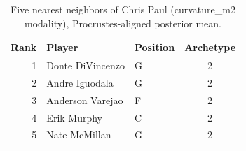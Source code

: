 \begin{table}[htbp]
  \centering\small
  \begin{tabular}{rllc}
    \toprule
    Rank & Player & Position & Archetype \\
    \midrule
    1 & Donte DiVincenzo & G & 2 \\
    2 & Andre Iguodala & G & 2 \\
    3 & Anderson Varejao & F & 2 \\
    4 & Erik Murphy & C & 2 \\
    5 & Nate McMillan & G & 2 \\
    \bottomrule
  \end{tabular}
  \caption{Five nearest neighbors of Chris Paul (curvature_m2 modality), Procrustes-aligned posterior mean.}
  \label{tab:Chris_Paul_neighbors_curvature_m2}
\end{table}

